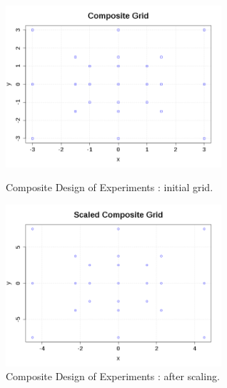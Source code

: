              \begin{figure}[H]
               \begin{minipage}{10cm}
                 \begin{center}
                   \includegraphics[width=8cm]{Figures/CompositeGrid.png}
                   \caption{Composite Design of Experiments  : initial grid.}
                   \label{CompositeGrid}
                 \end{center}
               \end{minipage}
               \hfill
               \begin{minipage}{10cm}
                 \begin{center}
                   \includegraphics[width=8cm]{Figures/ScaledCompositeGrid.png}
                   \caption{Composite Design of Experiments  : after scaling.}
                   \label{ScaledCompositeGrid}
                 \end{center}
               \end{minipage}
             \end{figure}

